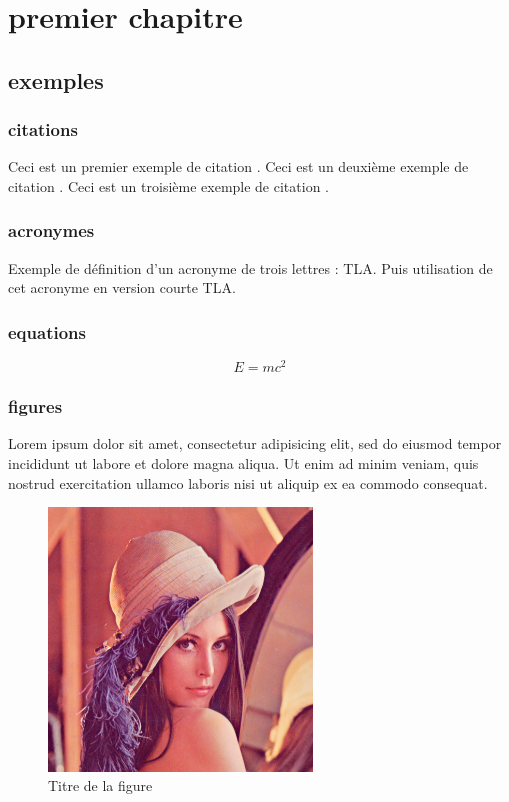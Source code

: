 \chapter{premier chapitre}
	
\section{exemples} 


\subsection{citations} 

Ceci est un premier exemple de citation \cite{Ful83}. Ceci est un deuxième exemple de citation \citep{Ful83}. Ceci est un troisième exemple de citation \citet{Ful83}.

\subsection{acronymes} 

Exemple de définition d'un acronyme de trois lettres : \ac{TLA}. Puis utilisation de cet acronyme en version courte \acs{TLA}.

\subsection{equations}   

\begin{equation}
E=mc^2
\end{equation}

\subsection{figures}   

Lorem ipsum dolor sit amet, consectetur adipisicing elit, sed do eiusmod
tempor incididunt ut labore et dolore magna aliqua. Ut enim ad minim veniam,
quis nostrud exercitation ullamco laboris nisi ut aliquip ex ea commodo
consequat.

\begin{figure}[H]
 \centering
 \includegraphics[width=7cm]{lenna.png}
 \caption{Titre de la figure}
 \label{fig:figure1}
\end{figure}

